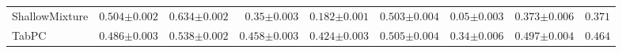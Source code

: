 \begin{tabular}{lrrrrrrr|r}
    ShallowMixture & $0.504${\tiny${\pm 0.002}$} & $0.634${\tiny${\pm 0.002}$} & $0.35${\tiny${\pm 0.003}$} & $0.182${\tiny${\pm 0.001}$} & $0.503${\tiny${\pm 0.004}$} & $0.05${\tiny${\pm 0.003}$} & $0.373${\tiny${\pm 0.006}$} & $0.371$ \\
    TabPC & $0.486${\tiny${\pm 0.003}$} & $0.538${\tiny${\pm 0.002}$} & $0.458${\tiny${\pm 0.003}$} & $0.424${\tiny${\pm 0.003}$} & $0.505${\tiny${\pm 0.004}$} & $0.34${\tiny${\pm 0.006}$} & $0.497${\tiny${\pm 0.004}$} & $0.464$ \\
    \bottomrule[1.0pt]
\end{tabular}